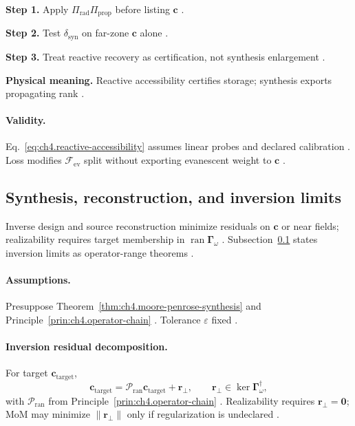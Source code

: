 \textbf{Step 1.} Apply \(\Pi_{\mathrm{rad}}\Pi_{\mathrm{prop}}\) before listing \(\mathbf{c}\) \cite{stratton1941}.

\textbf{Step 2.} Test \(\delta_{\mathrm{syn}}\) on far-zone \(\mathbf{c}\) alone \cite{harrington2001,devaney2004}.

\textbf{Step 3.} Treat reactive recovery as certification, not synthesis enlargement \cite{hansen1988}.

\textbf{Physical meaning.} Reactive accessibility certifies storage; synthesis exports propagating rank \cite{stratton1941}.

\paragraph{Validity.}
Eq.~\eqref{eq:ch4.reactive-accessibility} assumes linear probes and declared calibration \cite{harrington2001}. Loss modifies
\(\mathcal{F}_{\mathrm{ev}}\) split without exporting evanescent weight to \(\mathbf{c}\) \cite{stratton1941}.


\subsection{Synthesis, reconstruction, and inversion limits}
\label{sec:ch473}

Inverse design and source reconstruction minimize residuals on \(\mathbf{c}\) or near fields; realizability requires target membership in
\(\operatorname{ran}\boldsymbol{\Gamma}_\omega\) \cite{stratton1941,harrington2001,devaney2004}. Subsection~\ref{sec:ch473} states
inversion limits as operator-range theorems \cite{hansen1988}.

\paragraph{Assumptions.}
Presuppose Theorem~\ref{thm:ch4.moore-penrose-synthesis} and Principle~\ref{prin:ch4.operator-chain}
\cite{harrington2001,devaney2004,stratton1941}. Tolerance \(\varepsilon\) fixed \cite{hansen1988}.

\paragraph{Inversion residual decomposition.}
For target \(\mathbf{c}_{\mathrm{target}}\),
\begin{equation}
\label{eq:ch4.inversion-residual-decomposition}
\mathbf{c}_{\mathrm{target}}
=
\mathcal{P}_{\mathrm{ran}}\mathbf{c}_{\mathrm{target}}
+
\mathbf{r}_{\perp},
\qquad
\mathbf{r}_{\perp}\in\ker\boldsymbol{\Gamma}_\omega^{\dagger},
\end{equation}
with \(\mathcal{P}_{\mathrm{ran}}\) from Principle~\ref{prin:ch4.operator-chain} \cite{stratton1941,harrington2001}. Realizability
requires \(\mathbf{r}_{\perp}=\mathbf{0}\); MoM may minimize \(\|\mathbf{r}_{\perp}\|\) only if regularization is undeclared
\cite{devaney2004,hansen1988}.

